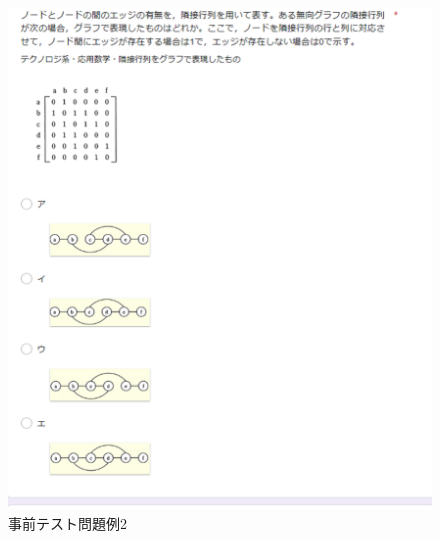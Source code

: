 \begin{figure}[htbp]
\begin{center}
\includegraphics[width=16cm]{img/jizen3.eps}
\end{center}
\caption{事前テスト問題例2}
\label{fig:jizen3}
\end{figure}

